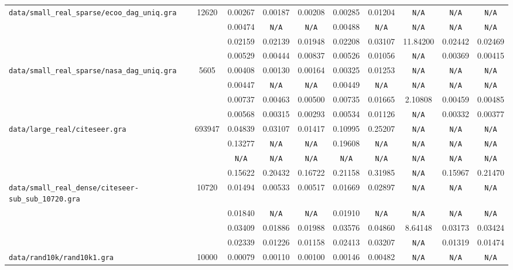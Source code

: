 \documentclass[12pt,a4paper,twoside]{article}
\begin{document}
{\begin{tabular}{ | l | c | c | c | c | c | c | c | c | c | }
\verb|data/small_real_sparse/ecoo_dag_uniq.gra| & 12620 & 0.00267 & 0.00187 & 0.00208 & 0.00285 & 0.01204 & \verb|N/A| & \verb|N/A| & \verb|N/A| \\
\verb| | &  & 0.00474 & \verb|N/A| & \verb|N/A| & 0.00488 & \verb|N/A| & \verb|N/A| & \verb|N/A| & \verb|N/A| \\
\verb| | &  & 0.02159 & 0.02139 & 0.01948 & 0.02208 & 0.03107 & 11.84200 & 0.02442 & 0.02469 \\
\verb| | &  & 0.00529 & 0.00444 & 0.00837 & 0.00526 & 0.01056 & \verb|N/A| & 0.00369 & 0.00415 \\
\hline
\verb|data/small_real_sparse/nasa_dag_uniq.gra| & 5605 & 0.00408 & 0.00130 & 0.00164 & 0.00325 & 0.01253 & \verb|N/A| & \verb|N/A| & \verb|N/A| \\
\verb| | &  & 0.00447 & \verb|N/A| & \verb|N/A| & 0.00449 & \verb|N/A| & \verb|N/A| & \verb|N/A| & \verb|N/A| \\
\verb| | &  & 0.00737 & 0.00463 & 0.00500 & 0.00735 & 0.01665 & 2.10808 & 0.00459 & 0.00485 \\
\verb| | &  & 0.00568 & 0.00315 & 0.00293 & 0.00534 & 0.01126 & \verb|N/A| & 0.00332 & 0.00377 \\
\hline
\verb|data/large_real/citeseer.gra| & 693947 & 0.04839 & 0.03107 & 0.01417 & 0.10995 & 0.25207 & \verb|N/A| & \verb|N/A| & \verb|N/A| \\
\verb| | &  & 0.13277 & \verb|N/A| & \verb|N/A| & 0.19608 & \verb|N/A| & \verb|N/A| & \verb|N/A| & \verb|N/A| \\
\verb| | &  & \verb|N/A| & \verb|N/A| & \verb|N/A| & \verb|N/A| & \verb|N/A| & \verb|N/A| & \verb|N/A| & \verb|N/A| \\
\verb| | &  & 0.15622 & 0.20432 & 0.16722 & 0.21158 & 0.31985 & \verb|N/A| & 0.15967 & 0.21470 \\
\hline
\verb|data/small_real_dense/citeseer-sub_sub_10720.gra| & 10720 & 0.01494 & 0.00533 & 0.00517 & 0.01669 & 0.02897 & \verb|N/A| & \verb|N/A| & \verb|N/A| \\
\verb| | &  & 0.01840 & \verb|N/A| & \verb|N/A| & 0.01910 & \verb|N/A| & \verb|N/A| & \verb|N/A| & \verb|N/A| \\
\verb| | &  & 0.03409 & 0.01886 & 0.01988 & 0.03576 & 0.04860 & 8.64148 & 0.03173 & 0.03424 \\
\verb| | &  & 0.02339 & 0.01226 & 0.01158 & 0.02413 & 0.03207 & \verb|N/A| & 0.01319 & 0.01474 \\
\hline
\verb|data/rand10k/rand10k1.gra| & 10000 & 0.00079 & 0.00110 & 0.00100 & 0.00146 & 0.00482 & \verb|N/A| & \verb|N/A| & \verb|N/A| \\

\end{tabular}}
\end{document}
